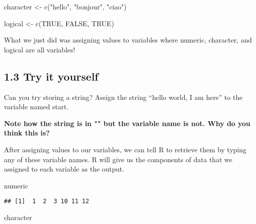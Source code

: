 \documentclass[
]{book}
\newenvironment{Shaded}{\begin{snugshade}}{\end{snugshade}}
\newcommand{\ConstantTok}[1]{\textcolor[rgb]{0.00,0.00,0.00}{#1}}
\newcommand{\FunctionTok}[1]{\textcolor[rgb]{0.00,0.00,0.00}{#1}}
\newcommand{\NormalTok}[1]{#1}
\newcommand{\OtherTok}[1]{\textcolor[rgb]{0.56,0.35,0.01}{#1}}
\newcommand{\StringTok}[1]{\textcolor[rgb]{0.31,0.60,0.02}{#1}}
\begin{document}
\begin{Shaded}
\begin{Highlighting}[]
\NormalTok{character }\OtherTok{\textless{}{-}} \FunctionTok{c}\NormalTok{(}\StringTok{"hello"}\NormalTok{, }\StringTok{"bonjour"}\NormalTok{, }\StringTok{"ciao"}\NormalTok{)}
\end{Highlighting}
\end{Shaded}

\begin{Shaded}
\begin{Highlighting}[]
\NormalTok{logical }\OtherTok{\textless{}{-}} \FunctionTok{c}\NormalTok{(}\ConstantTok{TRUE}\NormalTok{, }\ConstantTok{FALSE}\NormalTok{, }\ConstantTok{TRUE}\NormalTok{)}
\end{Highlighting}
\end{Shaded}

What we just did was assigning values to variables where numeric, character, and logical are all variables!

\hypertarget{try-it-yourself-2}{%
\subsection{1.3 Try it yourself}\label{try-it-yourself-2}}

Can you try storing a string? Assign the string ``hello world, I am here'' to the variable named start.

\textbf{Note how the string is in "" but the variable name is not. Why do you think this is?}

After assigning values to our variables, we can tell R to retrieve them by typing any of these variable names. R will give us the components of data that we assigned to each variable as the output.

\begin{Shaded}
\begin{Highlighting}[]
\NormalTok{numeric}
\end{Highlighting}
\end{Shaded}

\begin{verbatim}
## [1]  1  2  3 10 11 12
\end{verbatim}

\begin{Shaded}
\begin{Highlighting}[]
\NormalTok{character}
\end{Highlighting}
\end{Shaded}
\end{document}
